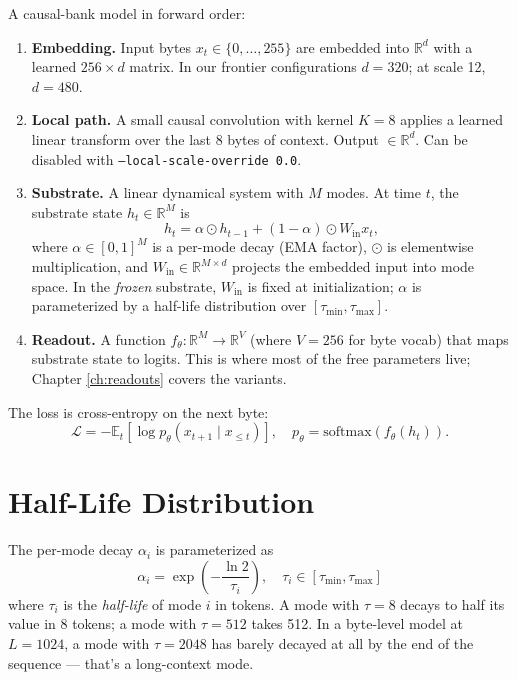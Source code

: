 \documentclass[11pt,openany]{book}
\theoremstyle{definition}
\theoremstyle{plain}
\begin{document}
A causal-bank model in forward order:
\begin{enumerate}
  \item \textbf{Embedding.} Input bytes $x_t \in \{0,\ldots,255\}$ are
    embedded into $\mathbb{R}^d$ with a learned $256 \times d$ matrix. In
    our frontier configurations $d = 320$; at scale 12, $d = 480$.
  \item \textbf{Local path.} A small causal convolution with kernel
    $K=8$ applies a learned linear transform over the last 8 bytes of
    context. Output $\in \mathbb{R}^d$. Can be disabled with
    \texttt{--local-scale-override 0.0}.
  \item \textbf{Substrate.} A linear dynamical system with $M$ modes. At
    time $t$, the substrate state $h_t \in \mathbb{R}^M$ is
    \begin{equation}
      h_t = \alpha \odot h_{t-1} + (1 - \alpha) \odot W_{\text{in}} x_t,
      \label{eq:substrate}
    \end{equation}
    where $\alpha \in [0,1]^M$ is a per-mode decay (EMA factor), $\odot$
    is elementwise multiplication, and $W_{\text{in}} \in
    \mathbb{R}^{M \times d}$ projects the embedded input into mode space.
    In the \emph{frozen} substrate, $W_{\text{in}}$ is fixed at
    initialization; $\alpha$ is parameterized by a half-life
    distribution over $[\tau_{\min}, \tau_{\max}]$.
  \item \textbf{Readout.} A function $f_\theta: \mathbb{R}^M \to
    \mathbb{R}^V$ (where $V = 256$ for byte vocab) that maps substrate
    state to logits. This is where most of the free parameters live;
    Chapter \ref{ch:readouts} covers the variants.
\end{enumerate}

The loss is cross-entropy on the next byte:
\begin{equation}
  \mathcal{L} = -\mathbb{E}_t\left[\log p_\theta(x_{t+1} \mid x_{\leq t})\right],
  \quad p_\theta = \mathrm{softmax}(f_\theta(h_t)).
\end{equation}

\section{Half-Life Distribution}

The per-mode decay $\alpha_i$ is parameterized as
\begin{equation}
  \alpha_i = \exp\left(-\frac{\ln 2}{\tau_i}\right),
  \quad \tau_i \in [\tau_{\min}, \tau_{\max}]
\end{equation}
where $\tau_i$ is the \emph{half-life} of mode $i$ in tokens. A mode with
$\tau = 8$ decays to half its value in 8 tokens; a mode with $\tau = 512$
takes 512. In a byte-level model at $L = 1024$, a mode with $\tau = 2048$
has barely decayed at all by the end of the sequence --- that's a
long-context mode.
\end{document}
